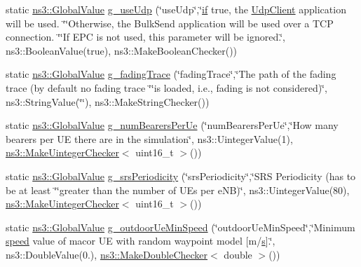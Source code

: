 \begin{DoxyCompactItemize}
\item 
static \hyperlink{classns3_1_1GlobalValue}{ns3\+::\+Global\+Value} \hyperlink{lena-dual-stripe_8cc_ad732cd203feb4fd159b65c70f2f14458}{g\+\_\+use\+Udp} (\char`\"{}use\+Udp\char`\"{},\char`\"{}\hyperlink{loss__OH__large__cities__urban_8m_ac77b6cfa3068152087725fe54b4ae8c8}{if} true, the \hyperlink{classns3_1_1UdpClient}{Udp\+Client} application will be used. \char`\"{}\char`\"{}Otherwise, the Bulk\+Send application will be used over a T\+CP connection. \char`\"{}\char`\"{}If E\+PC is not used, this parameter will be ignored.\char`\"{}, ns3\+::\+Boolean\+Value(true), ns3\+::\+Make\+Boolean\+Checker())
\item 
static \hyperlink{classns3_1_1GlobalValue}{ns3\+::\+Global\+Value} \hyperlink{lena-dual-stripe_8cc_a0abfba51e5ef4f0d9ccdb8da37781fca}{g\+\_\+fading\+Trace} (\char`\"{}fading\+Trace\char`\"{},\char`\"{}The path of the fading trace (by default no fading trace \char`\"{}\char`\"{}is loaded, i.\+e., fading is not considered)\char`\"{}, ns3\+::\+String\+Value(\char`\"{}\char`\"{}), ns3\+::\+Make\+String\+Checker())
\item 
static \hyperlink{classns3_1_1GlobalValue}{ns3\+::\+Global\+Value} \hyperlink{lena-dual-stripe_8cc_a88b6d21a90d9d78cd68f18d2be0a48f3}{g\+\_\+num\+Bearers\+Per\+Ue} (\char`\"{}num\+Bearers\+Per\+Ue\char`\"{},\char`\"{}How many bearers per UE there are in the simulation\char`\"{}, ns3\+::\+Uinteger\+Value(1), \hyperlink{namespacens3_aed274764da411ed9397a3524a7c9abb8}{ns3\+::\+Make\+Uinteger\+Checker}$<$ uint16\+\_\+t $>$())
\item 
static \hyperlink{classns3_1_1GlobalValue}{ns3\+::\+Global\+Value} \hyperlink{lena-dual-stripe_8cc_af41aa01898f8111e47e8720de056e297}{g\+\_\+srs\+Periodicity} (\char`\"{}srs\+Periodicity\char`\"{},\char`\"{}S\+RS Periodicity (has to be at least \char`\"{}\char`\"{}greater than the number of U\+Es per e\+NB)\char`\"{}, ns3\+::\+Uinteger\+Value(80), \hyperlink{namespacens3_aed274764da411ed9397a3524a7c9abb8}{ns3\+::\+Make\+Uinteger\+Checker}$<$ uint16\+\_\+t $>$())
\item 
static \hyperlink{classns3_1_1GlobalValue}{ns3\+::\+Global\+Value} \hyperlink{lena-dual-stripe_8cc_a516de123a86d19d570680c8a5d24f485}{g\+\_\+outdoor\+Ue\+Min\+Speed} (\char`\"{}outdoor\+Ue\+Min\+Speed\char`\"{},\char`\"{}Minimum \hyperlink{mmwave-amc-test_8cc_a6dc6e6f3c75c509ce943163afb5dade7}{speed} value of macor UE with random waypoint model \mbox{[}m/\hyperlink{generate__test__data__lte__sinr_8m_ad83eeb3a142285d1243a08c6b7026df8}{s}\mbox{]}.\char`\"{}, ns3\+::\+Double\+Value(0.), \hyperlink{namespacens3_a0f8000e7b66dd988358648f0b16c7709}{ns3\+::\+Make\+Double\+Checker}$<$ double $>$())

\end{DoxyCompactItemize}
